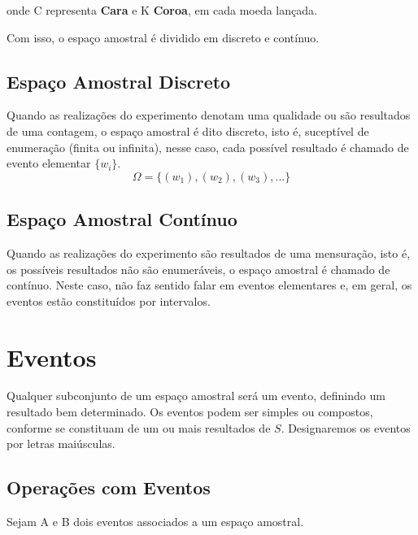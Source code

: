 onde C representa \textbf{Cara} e K \textbf{Coroa}, em cada moeda
lançada.\vskip0.3cm

Com isso, o espaço amostral é dividido em discreto e contínuo.

\newpage
\subsection{Espaço Amostral Discreto}

Quando as realizações do experimento denotam uma qualidade ou são
resultados de uma contagem, o espaço amostral é dito discreto,
isto é, suceptível de enumeração (finita ou infinita), nesse caso,
cada possível resultado é chamado de evento elementar $\{w_{i}\}$.
$$ \Omega = \{ (w_{1}),(w_{2}),(w_{3}),... \}  $$


\subsection{Espaço Amostral Contínuo}

Quando as realizações do experimento são resultados de uma
mensuração, isto é, os possíveis resultados não são enumeráveis, o
espaço amostral é chamado de contínuo. Neste caso, não faz sentido
falar em eventos elementares e, em geral, os eventos estão
constituídos por intervalos.


\section{Eventos}

Qualquer subconjunto de um espaço amostral será um evento,
definindo um resultado bem determinado. Os eventos podem ser
simples ou compostos, conforme se constituam de um ou mais
resultados de $S$. Designaremos os eventos por letras maiúsculas.


\subsection{Operações com Eventos}

Sejam A e B dois eventos associados a um espaço amostral.

